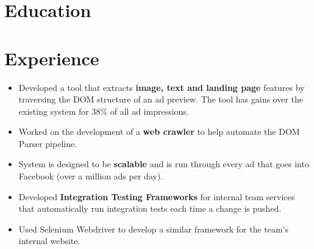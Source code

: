 \documentclass[10pt,a4paper,sans]{moderncv}
\begin{document}
\makecvtitle %


\section{Education}



\section{Experience}

{
\begin{itemize}
\item Developed a tool that extracts \textbf{image, text and landing page}
features by traversing the DOM structure of an ad preview. The tool has gains
over the existing system for 38\% of all ad impressions.
\item Worked on the development of a \textbf{web crawler} to help automate the
DOM Parser pipeline.
\item System is designed to be \textbf{scalable} and is run through every ad
that goes into Facebook (over a million ads per day).
\end{itemize}}

{
\begin{itemize}
\item Developed \textbf{Integration Testing Frameworks} for internal team
services that automatically run integration tests each time a change is pushed.
\item Used Selenium Webdriver to develop a similar framework for the team's
internal website.
\end{itemize}}
\end{document}
